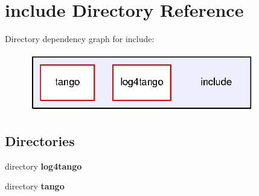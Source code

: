 \section{include Directory Reference}
\label{dir_386fff45e4fda5170448288777da6b76}
Directory dependency graph for include\-:
\nopagebreak
\begin{figure}[H]
\begin{center}
\leavevmode
\includegraphics[width=280pt]{dir_386fff45e4fda5170448288777da6b76_dep}
\end{center}
\end{figure}
\subsection*{Directories}
\begin{DoxyCompactItemize}
\item 
directory {\bf log4tango}
\item 
directory {\bf tango}
\end{DoxyCompactItemize}
